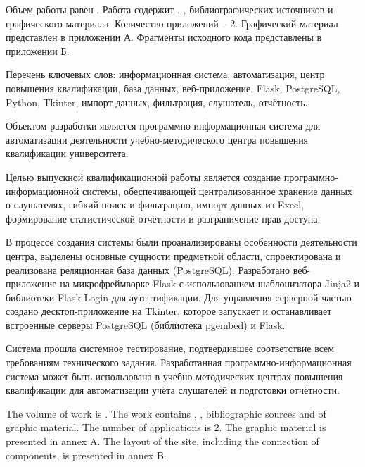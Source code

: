 
Объем работы равен . Работа содержит , ,  библиографических источников и  графического материала. Количество приложений – 2. Графический материал представлен в приложении А. Фрагменты исходного кода представлены в приложении Б.

Перечень ключевых слов: информационная система, автоматизация, центр повышения квалификации, база данных, веб-приложение, Flask, PostgreSQL, Python, Tkinter, импорт данных, фильтрация, слушатель, отчётность.

Объектом разработки является программно-информационная система для автоматизации деятельности учебно-методического центра повышения квалификации университета.

Целью выпускной квалификационной работы является создание программно-информационной системы, обеспечивающей централизованное хранение данных о слушателях, гибкий поиск и фильтрацию, импорт данных из Excel, формирование статистической отчётности и разграничение прав доступа.

В процессе создания системы были проанализированы особенности деятельности центра, выделены основные сущности предметной области, спроектирована и реализована реляционная база данных (PostgreSQL). Разработано веб-приложение на микрофреймворке Flask с использованием шаблонизатора Jinja2 и библиотеки Flask-Login для аутентификации. Для управления серверной частью создано десктоп-приложение на Tkinter, которое запускает и останавливает встроенные серверы PostgreSQL (библиотека pgembed) и Flask.

Система прошла системное тестирование, подтвердившее соответствие всем требованиям технического задания. Разработанная программно-информационная система может быть использована в учебно-методических центрах повышения квалификации для автоматизации учёта слушателей и подготовки отчётности.

  
The volume of work is . The work contains , ,  bibliographic sources and  of graphic material. The number of applications is 2. The graphic material is presented in annex A. The layout of the site, including the connection of components, is presented in annex B.

